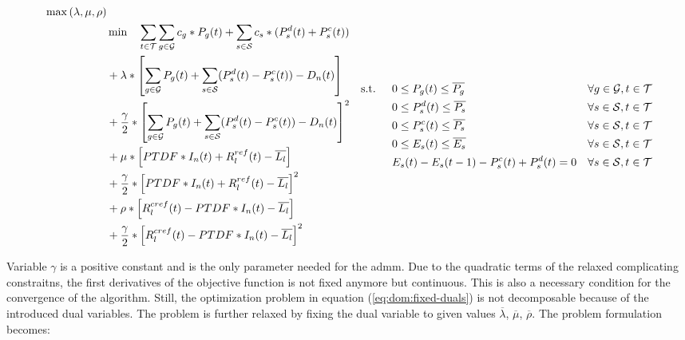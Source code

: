 \begin{subequations}
	\begin{align}
		\max{(\lambda, \mu, \rho)} \label{eq:dom:fixed-duals} \\
		 & \min \quad \sum_{t\in\mathcal{T}}\sum_{g\in\mathcal{G}}c_g*P_g(t) + \sum_{s\in\mathcal{S}}c_s*(P_s^d(t)+P_s^c(t)) \nonumber \\
		 & + \lambda * \left[\sum_{g\in\mathcal{G}}P_g(t) + \sum_{s\in\mathcal{S}}(P_s^d(t)-P_s^c(t))-D_n(t)\right]\nonumber \\
		 & + \frac{\gamma}{2} * \left[\sum_{g\in\mathcal{G}}P_g(t) + \sum_{s\in\mathcal{S}}(P_s^d(t)-P_s^c(t))-D_n(t)\right]^2 \nonumber \\
		 & + \mu * \left[PTDF * I_n(t) + R^{ref}_l(t) - \overline{L_l}\right] \nonumber \\
		 & + \frac{\gamma}{2} * \left[PTDF * I_n(t) + R^{ref}_l(t) - \overline{L_l}\right]^2 \nonumber \\
		 & + \rho * \left[R^{cref}_l(t) - PTDF * I_n(t) - \overline{L_l}\right]\nonumber \\
		 & + \frac{\gamma}{2} * \left[R^{cref}_l(t) - PTDF * I_n(t) - \overline{L_l}\right]^2 \nonumber
	\end{align}
	\begin{align}
		 \text{s.t. } \quad & 0 \leq P_g(t) \leq \overline{P_g} && \forall g \in \set{G}, t \in \set{T}\\\
		 & 0 \leq P_s^d(t) \leq \overline{P_s} && \forall s \in \set{S}, t \in \set{T}\\
		 & 0 \leq P_s^c(t) \leq \overline{P_s} && \forall s \in \set{S}, t \in \set{T}\\
		 & 0 \leq E_s(t) \leq \overline{E_s} && \forall s \in \set{S}, t \in \set{T}\\
		 & E_s(t) - E_s(t-1) - P_s^c(t) + P_s^d(t) = 0 && \forall s \in \set{S}, t \in \set{T}
	\end{align}
\end{subequations}

Variable $\gamma$ is a positive constant and is the only parameter needed for the \gls{admm}. Due to the quadratic terms of the relaxed complicating constraitns, the first derivatives of the objective function is not fixed anymore but continuous. This is also a necessary condition for the convergence of the algorithm. Still, the optimization problem in equation (\ref{eq:dom:fixed-duals}) is not decomposable because of the introduced dual variables. The problem is further relaxed by fixing the dual variable to given values $\overline{\lambda}$, $\overline{\mu}$, $\overline{\rho}$. The problem formulation becomes:

